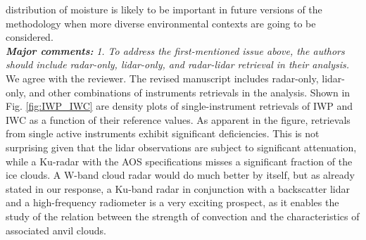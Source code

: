 \documentclass[12pt]{article}
\begin{document}
distribution of moisture is likely to be important in future versions of the methodology when more diverse environmental contexts are going to be considered.\\
\newline
\textit{\textbf{Major comments:}}
\textit{1. To address the first-mentioned issue above, the authors should include radar-only, lidar-only, and radar-lidar 
    retrieval in their analysis.}\\
\newline
We agree with the reviewer. The revised manuscript includes radar-only, lidar-only, and other combinations of instruments retrievals
 in the analysis.  Shown 
in Fig. \ref{fig:IWP_IWC} are density plots of single-instrument retrievals of IWP and IWC as a function of their reference values.
As apparent in the figure, retrievals from single active instruments exhibit significant deficiencies.  This is not surprising given that
the lidar observations are subject to significant attenuation, while a Ku-radar with the AOS specifications misses a significant fraction of
the ice clouds. A W-band cloud radar would do much better by itself, but as already stated in our response, a Ku-band radar in conjunction
with a backscatter lidar and a high-frequency radiometer is a very exciting prospect, as it enables the study of the relation between 
the strength of convection and the characteristics of associated anvil clouds. \\
\end{document}
